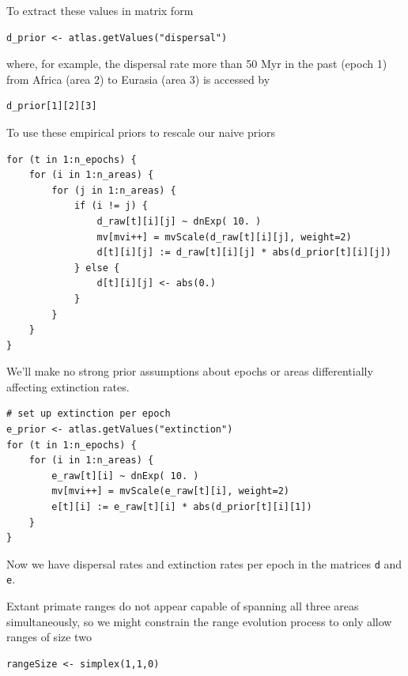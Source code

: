To extract these values in matrix form

\begin{snugshade}
\begin{lstlisting}
d_prior <- atlas.getValues("dispersal")
\end{lstlisting}
\end{snugshade}

where, for example, the dispersal rate more than 50 Myr in the past (epoch 1) from Africa (area 2) to Eurasia (area 3) is accessed by

\begin{snugshade}
\begin{lstlisting}
d_prior[1][2][3]
\end{lstlisting}
\end{snugshade}

To use these empirical priors to rescale our naive priors

\begin{snugshade}
\begin{lstlisting}
for (t in 1:n_epochs) {
	for (i in 1:n_areas) {
		for (j in 1:n_areas) {
			if (i != j) {
				d_raw[t][i][j] ~ dnExp( 10. )
				mv[mvi++] = mvScale(d_raw[t][i][j], weight=2)
				d[t][i][j] := d_raw[t][i][j] * abs(d_prior[t][i][j])
			} else {
				d[t][i][j] <- abs(0.)
			}
		}
	}
}
\end{lstlisting}
\end{snugshade}

We'll make no strong prior assumptions about epochs or areas differentially affecting extinction rates.

\begin{snugshade}
\begin{lstlisting}
# set up extinction per epoch
e_prior <- atlas.getValues("extinction")
for (t in 1:n_epochs) {
	for (i in 1:n_areas) {
		e_raw[t][i] ~ dnExp( 10. )
		mv[mvi++] = mvScale(e_raw[t][i], weight=2)
		e[t][i] := e_raw[t][i] * abs(d_prior[t][i][1])
	}
}
\end{lstlisting}
\end{snugshade}

Now we have dispersal rates and extinction rates per epoch in the matrices {\tt d} and {\tt e}.

Extant primate ranges do not appear capable of spanning all three areas simultaneously, so we might constrain the range evolution process to only allow ranges of size two

\begin{snugshade}
\begin{lstlisting}
rangeSize <- simplex(1,1,0)
\end{lstlisting}
\end{snugshade}

